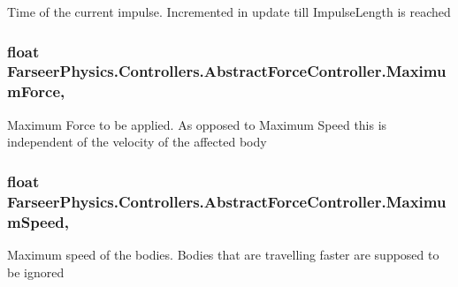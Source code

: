 Time of the current impulse. Incremented in update till Impulse\+Length is reached 

\hypertarget{class_farseer_physics_1_1_controllers_1_1_abstract_force_controller_a8bae1d3d1b67ab840c8c6e79ba478a83}{
\subsubsection[{Maximum\+Force}]{\setlength{\rightskip}{0pt plus 5cm}float Farseer\+Physics.\+Controllers.\+Abstract\+Force\+Controller.\+Maximum\+Force\hspace{0.3cm}{\ttfamily [get]}, {\ttfamily [set]}}}\label{class_farseer_physics_1_1_controllers_1_1_abstract_force_controller_a8bae1d3d1b67ab840c8c6e79ba478a83}


Maximum Force to be applied. As opposed to Maximum Speed this is independent of the velocity of the affected body 

\hypertarget{class_farseer_physics_1_1_controllers_1_1_abstract_force_controller_a74f774f4b684643afe72823f6783fb8f}{
\subsubsection[{Maximum\+Speed}]{\setlength{\rightskip}{0pt plus 5cm}float Farseer\+Physics.\+Controllers.\+Abstract\+Force\+Controller.\+Maximum\+Speed\hspace{0.3cm}{\ttfamily [get]}, {\ttfamily [set]}}}\label{class_farseer_physics_1_1_controllers_1_1_abstract_force_controller_a74f774f4b684643afe72823f6783fb8f}


Maximum speed of the bodies. Bodies that are travelling faster are supposed to be ignored 

